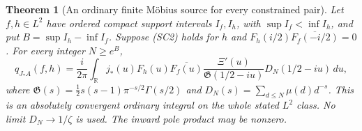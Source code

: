 \documentclass[11pt]{article}
\newtheorem{theorem}{Theorem}
\theoremstyle{remark}\newtheorem{remark}[theorem]{Remark}
\newcommand{\R}{\mathbb R}
\begin{document}
\begin{theorem}[An ordinary finite Möbius source for every constrained pair]
\label{thm:ordinary-finite-source}
Let \(f,h\in L^2\) have ordered compact support intervals
\(I_f,I_h\), with \(\sup I_f<\inf I_h\), and put
\(B=\sup I_h-\inf I_f\). Suppose (SC2) holds for \(h\) and
\(F_h(i/2)\overline{F_f(-i/2)}=0\).
For every integer \(N\ge e^B\),
\[
 q_{J_*A}(f,h)=\frac{i}{2\pi}\int_{\R}
 j_*(u)F_h(u)\overline{F_f(u)}
 \frac{\Xi'(u)}{\mathfrak G(1/2-iu)}D_N(1/2-iu)\,du,
                                                               \tag{SC5}
\]
where
\(\mathfrak G(s)=\tfrac12s(s-1)\pi^{-s/2}\Gamma(s/2)\) and
\(D_N(s)=\sum_{d\le N}\mu(d)d^{-s}\).
This is an absolutely convergent ordinary integral on the whole
stated \(L^2\) class. No limit \(D_N\to1/\zeta\) is used.
The inward pole product may be nonzero.
\end{theorem}
\end{document}
